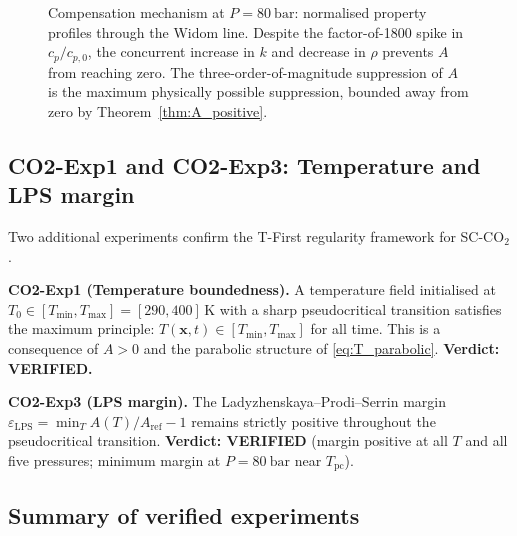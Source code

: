 \documentclass[12pt,a4paper]{article}
\newcommand{\eps}{\varepsilon}
\newcommand{\Tc}{T_{\mathrm{pc}}}   %
\newcommand{\Aref}{A_{\mathrm{ref}}}
\begin{document}
\begin{figure}[htbp]
  \centering
  \caption{Compensation mechanism at $P = \SI{80}{\bar}$: normalised property
    profiles through the Widom line.  Despite the factor-of-1800 spike in
    $c_p/c_{p,0}$, the concurrent increase in $k$ and decrease in $\rho$
    prevents $A$ from reaching zero.  The three-order-of-magnitude suppression
    of $A$ is the maximum physically possible suppression, bounded away from
    zero by Theorem~\protect\ref{thm:A_positive}.}
  \label{fig:compensation}
\end{figure}

\subsection{CO2-Exp1 and CO2-Exp3: Temperature and LPS margin}
\label{sec:numerical:exp1_exp3}

Two additional experiments confirm the T-First regularity framework for SC-CO$_2$.

\textbf{CO2-Exp1 (Temperature boundedness).}  A temperature field initialised at
$T_0 \in [T_{\min}, T_{\max}] = [290, 400]\,\si{\kelvin}$ with a sharp pseudocritical
transition satisfies the maximum principle: $T(\bm{x},t) \in [T_{\min}, T_{\max}]$
for all time.  This is a consequence of $A > 0$ and the parabolic structure of
\eqref{eq:T_parabolic}.  \textbf{Verdict: VERIFIED.}

\textbf{CO2-Exp3 (LPS margin).}  The Ladyzhenskaya--Prodi--Serrin margin
$\eps_{\mathrm{LPS}} = \min_T A(T)/\Aref - 1$ remains strictly positive throughout
the pseudocritical transition.  \textbf{Verdict: VERIFIED} (margin positive at all
$T$ and all five pressures; minimum margin at $P = \SI{80}{\bar}$ near $\Tc$).

\subsection{Summary of verified experiments}
\label{sec:numerical:summary}
\end{document}
